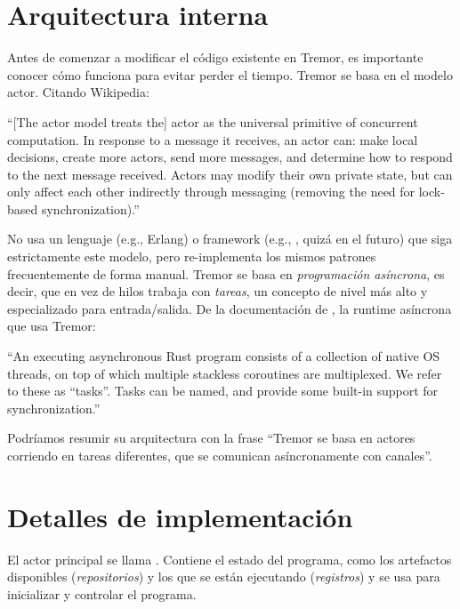 \section{Arquitectura interna}

Antes de comenzar a modificar el código existente en Tremor, es importante
conocer cómo funciona para evitar perder el tiempo. Tremor se basa en el modelo
actor. Citando Wikipedia:

``[The actor model treats the] actor as the universal primitive of concurrent
computation. In response to a message it receives, an actor can: make local
decisions, create more actors, send more messages, and determine how to respond
to the next message received. Actors may modify their own private state, but can
only affect each other indirectly through messaging (removing the need for
lock-based synchronization).''

No usa un lenguaje (e.g., Erlang) o framework (e.g., , quizá
en el futuro) que siga estrictamente este modelo, pero re-implementa los mismos
patrones frecuentemente de forma manual. Tremor se basa en \emph{programación
asíncrona}, es decir, que en vez de hilos trabaja con \emph{tareas}, un concepto
de nivel más alto y especializado para entrada/salida. De la documentación de
, la runtime asíncrona que usa Tremor:

``An executing asynchronous Rust program consists of a collection of native OS
threads, on top of which multiple stackless coroutines are multiplexed. We refer
to these as “tasks”. Tasks can be named, and provide some built-in support for
synchronization.''

Podríamos resumir su arquitectura con la frase ``Tremor se basa en actores
corriendo en tareas diferentes, que se comunican asíncronamente con canales''.

\section{Detalles de implementación}

El actor principal se llama . Contiene el estado del programa, como
los artefactos disponibles (\emph{repositorios}) y los que se están ejecutando
(\emph{registros}) y se usa para inicializar y controlar el programa.

